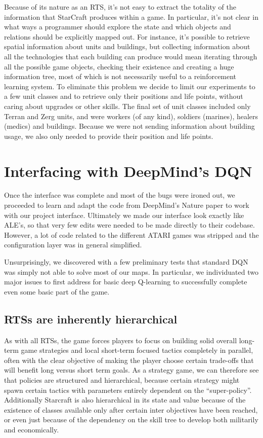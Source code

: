 Because of its nature as an RTS, it's not easy to extract the totality of the
information that StarCraft produces within a game. In particular, it's not clear
in what ways a programmer should explore the state and which objects and
relations should be explicitly mapped out. For instance, it's possible to
retrieve spatial information about units and buildings, but collecting
information about all the technologies that each building can produce would mean
iterating through all the possible game objects, checking their existence and
creating a huge information tree, most of which is not necessarily useful to a
reinforcement learning system. To eliminate this problem we decide to limit our
experiments to a few unit classes and to retrieve only their positions and life
points, without caring about upgrades or other skills. The final set of unit
classes included only Terran and Zerg units, and were workers (of any kind),
soldiers (marines), healers (medics) and buildings. Because we were not sending
information about building usage, we also only needed to provide their position
and life points.

\section{Interfacing with DeepMind's DQN}

Once the interface was complete and most of the bugs were ironed out, we
proceeded to learn and adapt the code from DeepMind's Nature paper to work with
our project interface. Ultimately we made our interface look exactly like ALE's,
so that very few edits were needed to be made directly to their codebase.
However, a lot of code related to the different ATARI games was stripped and the
configuration layer was in general simplified.

Unsurprisingly, we discovered with a few preliminary tests that standard DQN was
simply not able to solve most of our maps. In particular, we individuated two
major issues to first address for basic deep Q-learning to successfully complete
even some basic part of the game.

\subsection{RTSs are inherently hierarchical}

As with all RTSs, the game forces players to focus on building solid overall
long-term game strategies and local short-term focused tactics completely in
parallel, often with the clear objective of making the player choose certain
trade-offs that will benefit long versus short term goals. As a strategy game, we
can therefore see that policies are structured and hierarchical, because certain
strategy might spawn certain tactics with parameters entirely dependent on the
``super-policy''. Additionally Starcraft is also hierarchical in its state and
value because of the existence of classes available only after certain inter
objectives have been reached, or even just because of the dependency on the
skill tree to develop both militarily and economically.

